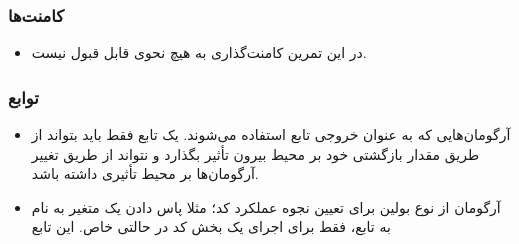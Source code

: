 \documentclass{utap}
\begin{document}
	\subsubsection{کامنت‌ها}
	  \begin{itemize}
	        \item در این تمرین کامنت‌گذاری به هیچ نحوی قابل قبول نیست.
	    \end{itemize}


	\subsubsection{توابع}
	  \begin{itemize}
	        \item آرگومان‌هایی که به عنوان خروجی تابع استفاده می‌شوند. یک تابع فقط باید بتواند از طریق مقدار بازگشتی خود بر محیط بیرون تأثیر بگذارد و نتواند از طریق تغییر آرگومان‌ها بر محیط تأثیری داشته باشد.
		\item آرگومان از نوع بولین برای تعیین نجوه عملکرد کد؛
مثلا پاس دادن یک متغیر به نام  به تابع، فقط برای اجرای یک بخش کد در حالتی خاص. این تابع
	    \end{itemize}
\end{document}
